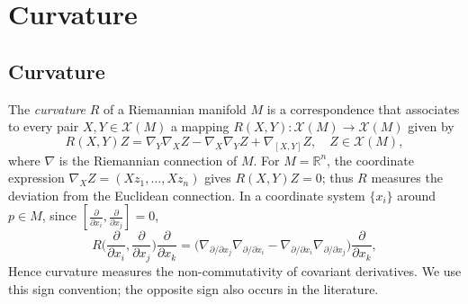 \chapter{Curvature}
\label{chap:dc-curvature}

\section{Curvature}

\begin{definition}[curvature]
  \label{def:dc-ch4-2-1}


  The \emph{curvature} $R$ of a Riemannian manifold $M$ is a correspondence that
  associates to every pair $X,Y\in\mathcal{X}(M)$ a mapping
  $R(X,Y):\mathcal{X}(M)\to\mathcal{X}(M)$ given by
  $$
  R(X,Y)Z=\nabla_Y\nabla_X Z-\nabla_X\nabla_Y Z+\nabla_{[X,Y]}Z,\quad Z\in\mathcal{X}(M),
  $$
  where $\nabla$ is the Riemannian connection of $M$.
  For $M=\mathbb{R}^n$, the coordinate expression
  $\nabla_X Z=(Xz_1,\dots,Xz_n)$ gives $R(X,Y)Z=0$; thus $R$ measures the
  deviation from the Euclidean connection.
  In a coordinate system $\{x_i\}$ around $p\in M$, since
  $[\frac{\partial}{\partial x_i},\frac{\partial}{\partial x_j}]=0$,
  $$
  R\Big(\frac{\partial}{\partial x_i},\frac{\partial}{\partial x_j}\Big)\frac{\partial}{\partial x_k}=\Big(\nabla_{\partial/\partial x_j}\nabla_{\partial/\partial x_i}-\nabla_{\partial/\partial x_i}\nabla_{\partial/\partial x_j}\Big)\frac{\partial}{\partial x_k},
  $$
  Hence curvature measures the non-commutativity of covariant derivatives. We use
  this sign convention; the opposite sign also occurs in the literature.
\end{definition}

